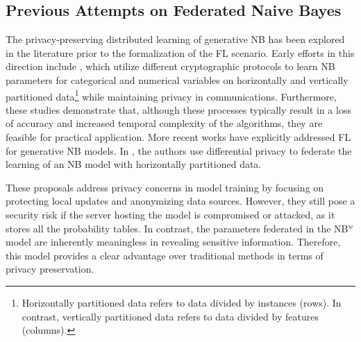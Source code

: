 \subsection{Previous Attempts on Federated Naive Bayes}\label{subsec:relatedWorkNB}

The privacy-preserving distributed learning of generative NB has been explored in the literature prior to the formalization of the FL scenario. Early efforts in this direction include \cite{Huai2015,Vaidya2007,Vaidya2013,Yi2009}, which utilize different cryptographic protocols to learn NB parameters for categorical and numerical variables on horizontally and vertically partitioned data\footnote{Horizontally partitioned data refers to data divided by instances (rows). In contrast, vertically partitioned data refers to data divided by features (columns).} while maintaining privacy in communications. Furthermore, these studies demonstrate that, although these processes typically result in a loss of accuracy and increased temporal complexity of the algorithms, they are feasible for practical application. More recent works have explicitly addressed FL for generative NB models. In \cite{Giaretta2023}, the authors use differential privacy to federate the learning of an NB model with horizontally partitioned data.

These proposals address privacy concerns in model training by focusing on protecting local updates and anonymizing data sources. However, they still pose a security risk if the server hosting the model is compromised or attacked, as it stores all the probability tables. In contrast, the parameters federated in the NB$^w$ model are inherently meaningless in revealing sensitive information. Therefore, this model provides a clear advantage over traditional methods in terms of privacy preservation.

%
%
